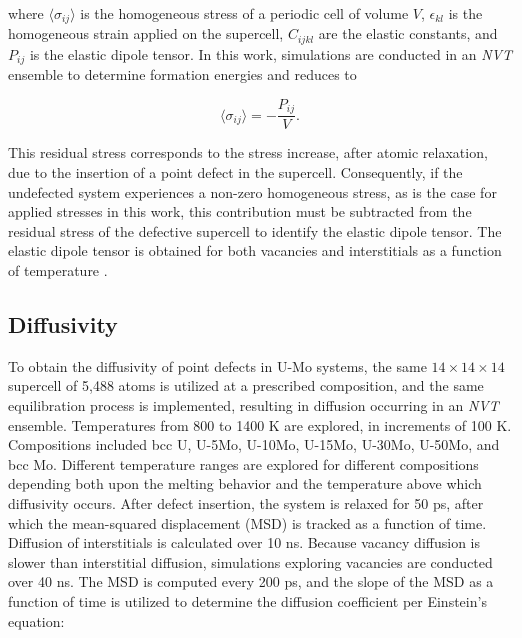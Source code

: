 \documentclass[review]{elsarticle}
\providecommand{\DIFadd}[1]{{\sf #1}} %
\providecommand{\DIFdel}[1]{{[..\footnote{removed: #1} ]}} %
\providecommand{\DIFaddbegin}{\protect\color{blue}} %
\providecommand{\DIFaddend}{\protect\color{black}} %
\providecommand{\DIFdelbegin}{\protect\color{red}} %
\providecommand{\DIFdelend}{\protect\color{black}} %
\newcommand{\DIFscaledelfig}{0.5}
\newlength{\DIFdelgraphicswidth} %
\newlength{\DIFdelgraphicsheight} %
\newcommand{\DIFaddincludegraphics}[2][]{{\color{blue}\fbox{\DIFOincludegraphics[#1]{#2}}}} %
\newcommand{\DIFdelincludegraphics}[2][]{%
\sbox{\DIFdelgraphicsbox}{\DIFOincludegraphics[#1]{#2}}%
\settoboxwidth{\DIFdelgraphicswidth}{\DIFdelgraphicsbox} %
\settoboxtotalheight{\DIFdelgraphicsheight}{\DIFdelgraphicsbox} %
\scalebox{\DIFscaledelfig}{%
\parbox[b]{\DIFdelgraphicswidth}{\usebox{\DIFdelgraphicsbox}\\[-\baselineskip] \rule{\DIFdelgraphicswidth}{0em}}\llap{\resizebox{\DIFdelgraphicswidth}{\DIFdelgraphicsheight}{%
\setlength{\unitlength}{\DIFdelgraphicswidth}%
\begin{picture}(1,1)%
\thicklines\linethickness{2pt} %
{\color[rgb]{1,0,0}\put(0,0){\framebox(1,1){}}}%
{\color[rgb]{1,0,0}\put(0,0){\line( 1,1){1}}}%
{\color[rgb]{1,0,0}\put(0,1){\line(1,-1){1}}}%
\end{picture}%
}\hspace*{3pt}}} %
} %
\DeclareRobustCommand{\DIFaddbegin}{\DIFOaddbegin \let\includegraphics\DIFaddincludegraphics} %
\DeclareRobustCommand{\DIFaddend}{\DIFOaddend \let\includegraphics\DIFOincludegraphics} %
\DeclareRobustCommand{\DIFdelbegin}{\DIFOdelbegin \let\includegraphics\DIFdelincludegraphics} %
\DeclareRobustCommand{\DIFdelend}{\DIFOaddend \let\includegraphics\DIFOincludegraphics} %
\begin{document}
\noindent where $\langle \sigma_{ij} \rangle$ is the homogeneous stress of a periodic cell of volume $V$, $\epsilon_{kl}$ is the homogeneous strain applied on the supercell, $C_{ijkl}$ are the elastic constants, and $P_{ij}$ is the elastic dipole tensor. In this work, simulations are conducted in an \textit{NVT} ensemble to determine formation energies and  reduces to 

\begin{equation}\label{eq:dipole2}
    \langle \sigma_{ij} \rangle = - \frac{P_{ij}}{V}.
\end{equation}

This residual stress corresponds to the stress increase, after atomic relaxation, due to the insertion of a point defect in the supercell. Consequently, if the undefected system experiences a non-zero homogeneous stress, as is the case for applied stresses in this work, this contribution must be subtracted from the residual stress of the defective supercell to identify the elastic dipole tensor. The elastic dipole tensor is obtained for both vacancies and interstitials as a function of temperature \DIFdelbegin \DIFdel{, composition, and applied stress}\DIFdelend \DIFaddbegin \DIFadd{and composition}\DIFaddend .




\subsection{Diffusivity}

To obtain the diffusivity of point defects in U-Mo systems, the same $14 \times 14 \times 14$ supercell of 5,488 atoms is utilized at a prescribed composition, and the same equilibration process is implemented, resulting in diffusion occurring in an \textit{NVT} ensemble. Temperatures from 800 to 1400 K are explored, in increments of 100 K. Compositions included bcc U, U-5Mo, U-10Mo, U-15Mo, U-30Mo, U-50Mo, and bcc Mo. Different temperature ranges are explored for different compositions depending both upon the melting behavior and the temperature above which diffusivity occurs. After defect insertion, the system is relaxed for 50 ps, after which the mean-squared displacement (MSD) is tracked as a function of time. Diffusion of interstitials is calculated over 10 ns. Because vacancy diffusion is slower than interstitial diffusion, simulations exploring vacancies are conducted over 40 ns. The MSD is computed every 200 ps, and the slope of the MSD as a function of time is utilized to determine the diffusion coefficient per Einstein's equation:
\end{document}
